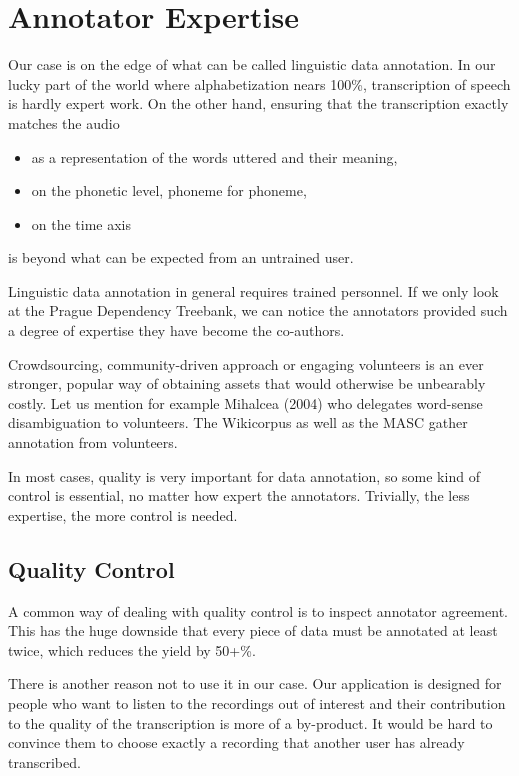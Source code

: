 \documentclass{itatnew}
\begin{document}
\section{Annotator Expertise}

Our case is on the edge of what can be called linguistic data annotation. In our
lucky part of the world where alphabetization nears 100\%, transcription of
speech is hardly expert work. On the other hand, ensuring that the transcription
exactly matches the audio
\begin{itemize}
\item{as a representation of the words uttered and their meaning,}
\item{on the phonetic level, phoneme for phoneme,}
\item{on the time axis}
\end{itemize}
is beyond what can be expected from an untrained user.

Linguistic data annotation in general requires trained personnel. If we only
look at the Prague Dependency Treebank, we can notice the annotators provided
such a degree of expertise they have become the
co-authors\cite{hajivc2005complex}.

Crowdsourcing, community-driven approach or engaging volunteers is an ever
stronger, popular way of obtaining assets that would otherwise be unbearably
costly. Let us mention for example Mihalcea (2004)\cite{mihalcea2004building}
who delegates word-sense disambiguation to volunteers. The
Wikicorpus\cite{reese2010wikicorpus} as well as the MASC\cite{ide2010manually}
gather annotation from volunteers.

In most cases, quality is very important for data annotation, so some kind of
control is essential, no matter how expert the annotators. Trivially, the less
expertise, the more control is needed.

\subsection{Quality Control}

A common way of dealing with quality control is to inspect annotator agreement.
This has the huge downside that every piece of data must be annotated at least
twice, which reduces the yield by 50+\%.

There is another reason not to use it in our case. Our application is
designed for people who want to listen to the recordings out of interest and
their contribution to the quality of the transcription is more of a by-product.
It would be hard to convince them to choose exactly a recording that another
user has already transcribed.
\end{document}
